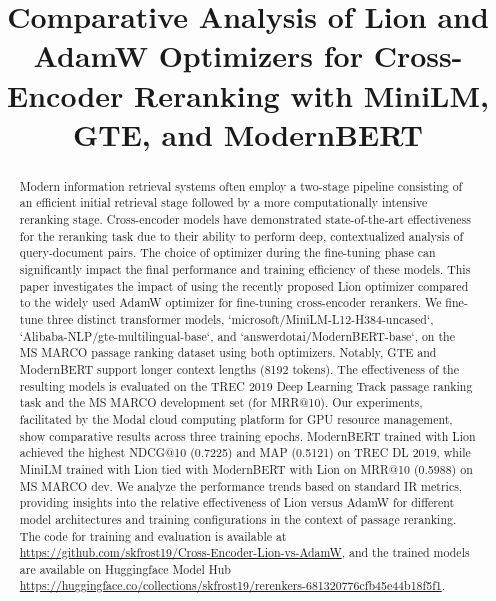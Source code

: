 \documentclass[conference]{IEEEtran}
\begin{document}
\title{Comparative Analysis of Lion and AdamW Optimizers for Cross-Encoder Reranking with MiniLM, GTE, and ModernBERT}

\author{
}

\maketitle

\begin{abstract}
Modern information retrieval systems often employ a two-stage pipeline consisting of an efficient initial retrieval stage followed by a more computationally intensive reranking stage. Cross-encoder models have demonstrated state-of-the-art effectiveness for the reranking task due to their ability to perform deep, contextualized analysis of query-document pairs. The choice of optimizer during the fine-tuning phase can significantly impact the final performance and training efficiency of these models. This paper investigates the impact of using the recently proposed Lion optimizer compared to the widely used AdamW optimizer for fine-tuning cross-encoder rerankers. We fine-tune three distinct transformer models, `microsoft/MiniLM-L12-H384-uncased`, `Alibaba-NLP/gte-multilingual-base`, and `answerdotai/ModernBERT-base`, on the MS MARCO passage ranking dataset using both optimizers. Notably, GTE and ModernBERT support longer context lengths (8192 tokens). The effectiveness of the resulting models is evaluated on the TREC 2019 Deep Learning Track passage ranking task and the MS MARCO development set (for MRR@10). Our experiments, facilitated by the Modal cloud computing platform for GPU resource management, show comparative results across three training epochs. ModernBERT trained with Lion achieved the highest NDCG@10 (0.7225) and MAP (0.5121) on TREC DL 2019, while MiniLM trained with Lion tied with ModernBERT with Lion on MRR@10 (0.5988) on MS MARCO dev. We analyze the performance trends based on standard IR metrics, providing insights into the relative effectiveness of Lion versus AdamW for different model architectures and training configurations in the context of passage reranking.
The code for training and evaluation is available at \url{https://github.com/skfrost19/Cross-Encoder-Lion-vs-AdamW}, and the trained models are available on Huggingface Model Hub \url{https://huggingface.co/collections/skfrost19/rerenkers-681320776cfb45e44b18f5f1}.
\end{abstract}
\end{document}
